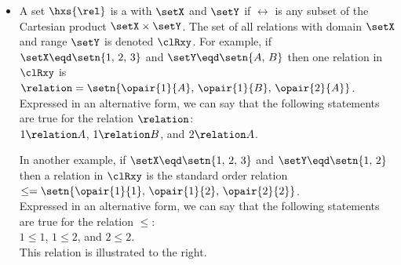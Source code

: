 \begin{itemize}
  \item A set $\hxs{\rel}$ is a  with  $\setX$ and  $\setY$ if
        $\rel$ is any subset of the Cartesian product $\setX\times\setY$.%
        The set of all relations with domain $\setX$ and range $\setY$ is denoted $\clRxy$.
        For example, if $\setX\eqd\setn{1,\,2,\,3}$ and $\setY\eqd\setn{A,\,B}$ then one relation in $\clRxy$ is
        \\\indentx$\relation = \setn{\opair{1}{A},\,\opair{1}{B},\,\opair{2}{A}}$.
        \\Expressed in an alternative form, we can say that the following statements are true for the relation $\relation$: 
        \\\indentx$1\relation A$, $1\relation B$, and $2\relation A$.

        \begin{minipage}{\tw-50mm-10mm}
          In another example, if $\setX\eqd\setn{1,\,2,\,3}$ and $\setY\eqd\setn{1,\,2}$ then a relation in $\clRxy$ is
          the standard order relation
          \\\indentx$\le = \setn{\opair{1}{1},\,\opair{1}{2},\,\opair{2}{2}}$.
          \\Expressed in an alternative form, we can say that the following statements are true for the relation $\le$: 
        \\\indentx$1\le 1$, $1\le 2$, and $2\le 2$.
        \\This relation is illustrated to the right.
        \indxs{\le}
        \end{minipage}
        \hfill
        \begin{minipage}{50mm}
          
        \end{minipage}


\end{itemize}
